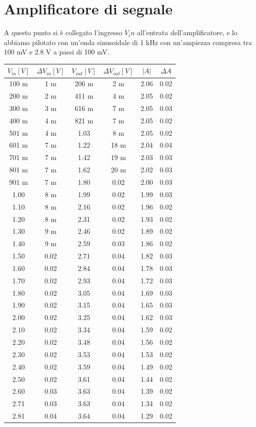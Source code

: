 \documentclass[10pt, a4paper, italian]{article}
\begin{document}
\section{Amplificatore di segnale}
A questo punto si è collegato l'ingresso $V_in$ all'entrata dell'amplificatore, e lo abbiamo pilotato con un'onda sinusoidale di 1 kHz con un'ampiezza compresa tra 100 mV e 2.8 V a passi di 100 mV.
\begin{table}[H]
\centering
\begin{tabular}{cccccc}

$V_{in} [V]$ & $\Delta V_{in}[V]$ & $V_{out} [V]$ & $\Delta V_{out} [V]$ & $|A|$ & $\Delta A$ \\
\midrule
100 m & 1 m  & 206 m & 2 m   & 2.06 & 0.02 \\
200 m & 2 m  & 411 m & 4 m   & 2.05 & 0.02 \\
300 m & 3 m  & 616 m & 7 m  & 2.05 & 0.03 \\
400 m & 4 m  & 821 m & 7 m  & 2.05 & 0.02 \\
501 m & 4 m  & 1.03  & 8 m  & 2.05 & 0.02 \\
601 m & 7 m  & 1.22  & 18 m & 2.04 & 0.04 \\
701 m & 7 m  & 1.42  & 19 m & 2.03 & 0.03 \\
801 m & 7 m  & 1.62  & 20 m & 2.02 & 0.03 \\
901 m & 7 m  & 1.80  & 0.02 & 2.00 & 0.03 \\
1.00  & 8 m  & 1.99  & 0.02 & 1.99 & 0.03 \\
1.10  & 8 m  & 2.16  & 0.02 & 1.96 & 0.02 \\
1.20  & 8 m  & 2.31  & 0.02 & 1.93 & 0.02 \\
1.30  & 9 m  & 2.46  & 0.02 & 1.89 & 0.02 \\
1.40  & 9 m  & 2.59  & 0.03 & 1.86 & 0.02 \\
1.50  & 0.02 & 2.71  & 0.04 & 1.82 & 0.03 \\
1.60  & 0.02 & 2.84  & 0.04 & 1.78 & 0.03 \\
1.70  & 0.02 & 2.93  & 0.04 & 1.72 & 0.03 \\
1.80  & 0.02 & 3.05  & 0.04 & 1.69 & 0.03 \\
1.90  & 0.02 & 3.15  & 0.04 & 1.65 & 0.03 \\
2.00  & 0.02 & 3.25  & 0.04 & 1.62 & 0.03 \\
2.10  & 0.02 & 3.34  & 0.04 & 1.59 & 0.02 \\
2.20  & 0.02 & 3.48  & 0.04 & 1.56 & 0.02 \\
2.30  & 0.02 & 3.53  & 0.04 & 1.53 & 0.02 \\
2.40  & 0.02 & 3.59  & 0.04 & 1.49 & 0.02 \\
2.50  & 0.02 & 3.61  & 0.04 & 1.44 & 0.02 \\
2.60  & 0.03 & 3.63  & 0.04 & 1.39 & 0.02 \\
2.71  & 0.03 & 3.63  & 0.04 & 1.34 & 0.02 \\
2.81  & 0.04 & 3.64  & 0.04 & 1.29 & 0.02 \\
\bottomrule
\end{tabular}
\end{table}
\end{document}
